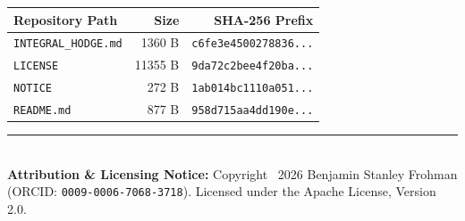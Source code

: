 \documentclass[11pt,a4paper]{article}
\begin{document}
\begin{center}
\small
\begin{tabular}{p{}rr}
\toprule
\textbf{Repository Path} & \textbf{Size} & \textbf{SHA-256 Prefix} \\
\midrule
\texttt{INTEGRAL\_HODGE.md} & 1360 B & \texttt{c6fe3e4500278836...} \\
\texttt{LICENSE} & 11355 B & \texttt{9da72c2bee4f20ba...} \\
\texttt{NOTICE} & 272 B & \texttt{1ab014bc1110a051...} \\
\texttt{README.md} & 877 B & \texttt{958d715aa4dd190e...} \\
\bottomrule
\end{tabular}
\end{center}

\vfill
\noindent\rule{\textwidth}{0.4pt}\\
\footnotesize
\textbf{Attribution \& Licensing Notice:} Copyright \textcopyright\ 2026 Benjamin Stanley Frohman (ORCID: \texttt{0009-0006-7068-3718}).
Licensed under the Apache License, Version 2.0.
\end{document}

